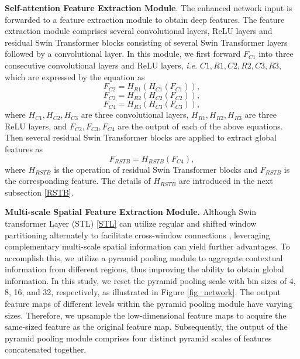 \documentclass[10pt,journal]{IEEEtran}
\begin{document}
\textbf{Self-attention Feature Extraction Module}. 
The enhanced network input is forwarded to a feature extraction module to obtain deep features. The feature extraction module comprises several convolutional layers, ReLU layers and residual Swin Transformer blocks consisting of several Swin Transformer layers followed by a convolutional layer. 
%
In this module, we first forward $F_{C1}$ into three consecutive convolutional layers and ReLU layers, \textit{i.e}. $C1, R1, C2, R2, C3, R3$, which are expressed by the equation as
\begin{equation}
	F_{C2}=      H_{R1}\left (  H_{C1} \left ( F_{C1} \right )  \right )  
	, \label{eq8}
\end{equation}
\begin{equation}
	F_{C3}=H_{R2}\left (  H_{C2} \left ( F_{C2} \right )  \right )  
	, \label{eq9}
\end{equation}
\begin{equation}
	F_{C4}=H_{R3}\left (  H_{C3} \left ( F_{C3} \right )  \right )  
	, \label{eq10}
\end{equation}
where $H_{C1}, H_{C2}, H_{C3}$ are three convolutional layers, $H_{R1}, H_{R2}, H_{R3}$ are three ReLU layers, and $F_{C2}, F_{C3}, F_{C4}$ are the output of each of the above equations. 
Then several residual Swin Transformer blocks are applied to extract global features as 
\begin{equation}
	F_{RSTB}=H_{RSTB}\left (F_{C4}\right )  
	, \label{eq_RSTB}
\end{equation}
where $H_{RSTB}$ is the operation of residual Swin Transformer blocks and $F_{RSTB}$ is the corresponding feature. The details of $H_{RSTB}$ are introduced in the next subsection \ref{RSTB}. 

\textbf{Multi-scale Spatial Feature Extraction Module. }
Although Swin transformer Layer (STL) \ref{STL} can utilize regular and shifted window partitioning alternately to facilitate cross-window connections \cite{liuSwinTransformerHierarchical2021}, leveraging complementary multi-scale spatial information can yield further advantages. 
To accomplish this, we utilize a pyramid pooling module \cite{heSpatialPyramidPooling2015,zhaoPyramidSceneParsing2017} to aggregate contextual information from different regions, thus improving the ability to obtain global information. 
In this study, we reset the pyramid pooling scale with bin sizes of 4, 8, 16, and 32, respectively, as illustrated in Figure \ref{fig_network}. The output feature maps of different levels within the pyramid pooling module have varying sizes. Therefore, we upsample the low-dimensional feature maps to acquire the same-sized feature as the original feature map. Subsequently, the output of the pyramid pooling module comprises four distinct pyramid scales of features concatenated together. 
\end{document}
